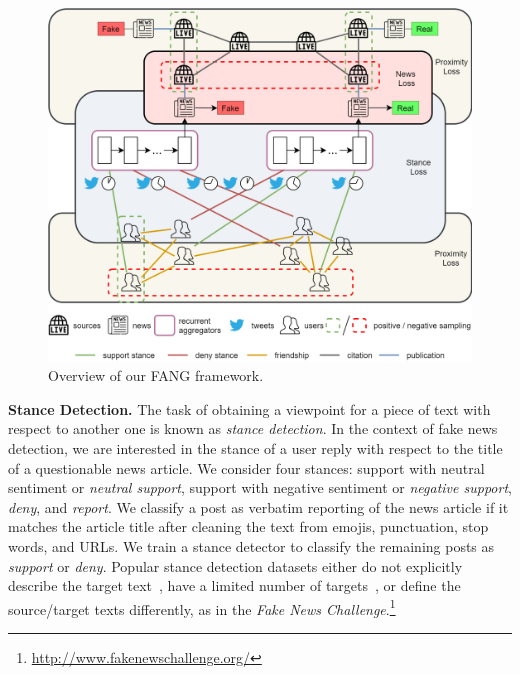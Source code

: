 \documentclass[sigconf]{acmart}
\theoremstyle{definition}
\theoremstyle{hypothesis}
\begin{document}
\begin{figure}[t]
\centering
\includegraphics[scale=0.18]{fang.png}
\caption{Overview of our FANG framework.}
\label{fig:fang_overview}
\end{figure}

\textbf{Stance Detection.} The task of obtaining a viewpoint for a piece of text with respect to another one is known as \textit{stance detection}. 
In the context of fake news detection, we are interested in the stance of a user reply with respect to the title of a questionable news article.
We consider four stances: support with neutral sentiment or \textit{neutral support}, support with negative sentiment or \textit{negative support}, \textit{deny}, and \textit{report}. We classify a post as verbatim reporting of the news article if it matches the article title after cleaning the text from emojis, punctuation, stop words, and URLs.
We train a stance detector to classify the remaining posts as 
\textit{support} or \textit{deny}.
Popular stance detection datasets either do not explicitly describe the target text~\cite{derczynski-etal-2017-semeval}, have a limited number of targets~\cite{sobhani-etal-2017-dataset,mohammad-etal-2016-semeval}, or define the source/target texts differently, as in the \emph{Fake News Challenge}.\footnote{\scriptsize{\url{http://www.fakenewschallenge.org/}}} 
\end{document}
